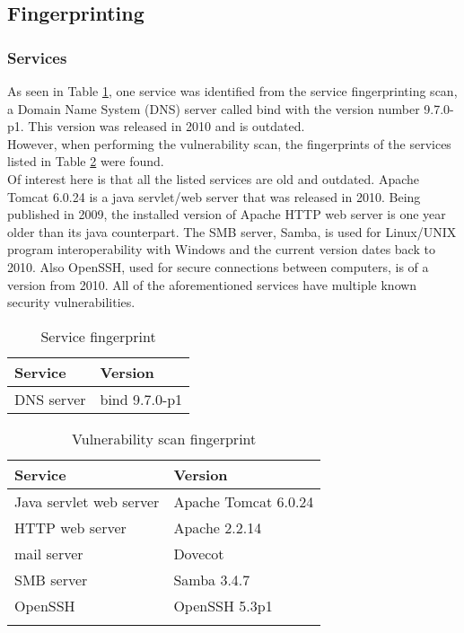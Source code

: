 \newpage

\subsection{Fingerprinting}


\subsubsection{Services}
\label{ssub:services_result}
As seen in Table \ref{tab:service_fingerprint}, one service was identified from the service fingerprinting scan, a Domain Name System (DNS) server called bind with the version number 9.7.0-p1. This version was released in 2010 and is outdated. \\

\noindent However, when performing the vulnerability scan, the fingerprints of the services listed in Table \ref{tab:vul_fingerprint} were found. \\

\noindent Of interest here is that all the listed services are old and outdated. Apache Tomcat 6.0.24 is a java servlet/web server that was released in 2010. Being published in 2009, the installed version of Apache HTTP web server is one year older than its java counterpart. The SMB server, Samba, is used for Linux/UNIX program interoperability with Windows and the current version dates back to 2010. Also OpenSSH, used for secure connections between computers, is of a version from 2010. All of the aforementioned services have multiple known security vulnerabilities.

\begin{table}[htb]
 \centering
 \caption{Service fingerprint} \label{tab:service_fingerprint}
 \begin{tabular}{m{4cm}p{3cm}} \toprule
 \textbf{Service} & \textbf{Version} \\ \midrule
 DNS server & bind 9.7.0-p1 \\ \bottomrule
 \end{tabular} 
\end{table}

\begin{table}[htb]
 \centering
 \caption{Vulnerability scan fingerprint} \label{tab:vul_fingerprint}
 \begin{tabular}{m{4cm}p{3cm}} \toprule
 \textbf{Service} & \textbf{Version} \\ \midrule
    Java servlet web server    &   Apache \newline Tomcat 6.0.24 \\
    HTTP \newline web server            &   Apache 2.2.14 \\
    mail server                 &   Dovecot \\
    SMB server               &   Samba 3.4.7 \\
    OpenSSH             &   OpenSSH 5.3p1 \\
 \\ \bottomrule
 \end{tabular} 
\end{table}


